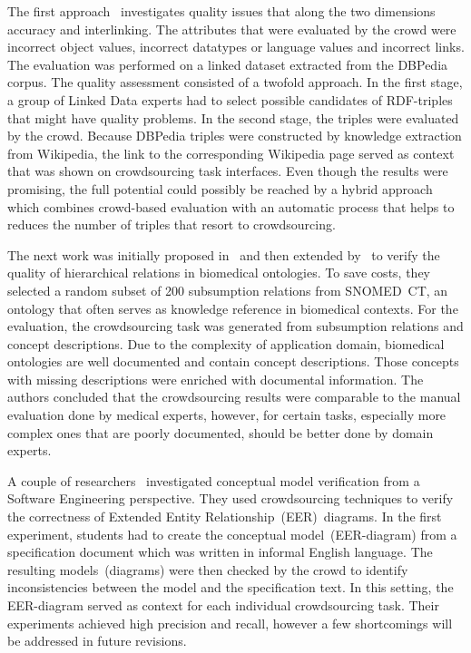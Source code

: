 The first approach~\cite{acosta2018} investigates quality issues that along the two dimensions accuracy and interlinking. The attributes that were evaluated by the crowd were incorrect object values, incorrect datatypes or language values and incorrect links. The evaluation was performed on a linked dataset extracted from the DBPedia corpus. The quality assessment consisted of a twofold approach. In the first stage, a group of Linked Data experts had to select possible candidates of RDF-triples that might have quality problems. In the second stage, the triples were evaluated by the crowd. Because DBPedia triples were constructed by knowledge extraction from Wikipedia, the link to the corresponding Wikipedia page served as context that was shown on crowdsourcing task interfaces. Even though the results were promising, the full potential could possibly be reached by a hybrid approach which combines crowd-based evaluation with an automatic process that helps to reduces the number of triples that resort to crowdsourcing. 

The next work was initially proposed in~\cite{mortensen2015} and then extended by~\cite{mortensen2016} to verify the quality of hierarchical relations in biomedical ontologies. To save costs, they selected a random subset of 200 subsumption relations from SNOMED~CT, an ontology that often serves as knowledge reference in biomedical contexts. For the evaluation, the crowdsourcing task was generated from subsumption relations and concept descriptions. Due to the complexity of application domain, biomedical ontologies are well documented and contain concept descriptions. Those concepts with missing descriptions were enriched with documental information. The authors concluded that the crowdsourcing results were comparable to the manual evaluation done by medical experts, however, for certain tasks, especially more complex ones that are poorly documented, should be better done by domain experts. 

A couple of researchers~\cite{sabou2018, winkler2017, winkler2017_2} investigated conceptual model verification from a Software Engineering perspective. They used crowdsourcing techniques to verify the correctness of Extended Entity Relationship~(EER)~diagrams. In the first experiment, students had to create the conceptual model~(EER-diagram) from a specification document which was written in informal English language. The resulting models~(diagrams) were then checked by the crowd to identify inconsistencies between the model and the specification text. In this setting, the EER-diagram served as context for each individual crowdsourcing task. Their experiments achieved high precision and recall, however a few shortcomings will be addressed in future revisions. 

